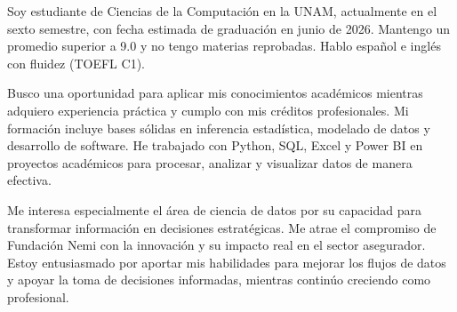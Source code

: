 
\cvparagraph{}

Soy estudiante de Ciencias de la Computación en la UNAM, actualmente en el sexto semestre, con fecha estimada de graduación en junio de 2026. Mantengo un promedio superior a 9.0 y no tengo materias reprobadas. Hablo español e inglés con fluidez (TOEFL C1).

Busco una oportunidad para aplicar mis conocimientos académicos mientras adquiero experiencia práctica y cumplo con mis créditos profesionales. Mi formación incluye bases sólidas en inferencia estadística, modelado de datos y desarrollo de software. He trabajado con Python, SQL, Excel y Power BI en proyectos académicos para procesar, analizar y visualizar datos de manera efectiva.

Me interesa especialmente el área de ciencia de datos por su capacidad para transformar información en decisiones estratégicas. Me atrae el compromiso de Fundación Nemi con la innovación y su impacto real en el sector asegurador. Estoy entusiasmado por aportar mis habilidades para mejorar los flujos de datos y apoyar la toma de decisiones informadas, mientras continúo creciendo como profesional.
